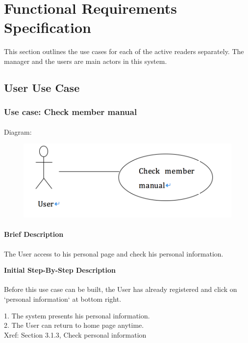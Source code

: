 \documentclass[12pt]{report}
\begin{document}
\section{Functional Requirements Specification}
\paragraph{}
This section outlines the use cases for each of the active readers separately. The manager and the users are main actors in this system.

\subsection{ User Use Case}
\subsubsection{Use case:  Check member manual}

\paragraph{}
Diagram: 
\begin{figure}[!htb]
  \includegraphics{1.PNG}
\end{figure}
\paragraph{}
\begin{flushleft}
\textbf{Brief Description }
\paragraph{}
The User access to his personal page and check his personal information. \\

\begin{flushleft}
\textbf{Initial Step-By-Step Description }
\paragraph{}
Before this use case can be built, the User has already registered and click on `personal information` at bottom right. 

\begin{flushleft}
1.	The system presents his personal information. \\
2.	The User can return to home page anytime. \\
Xref: Section 3.1.3, Check personal information
\end{flushleft}
\end{flushleft}
\end{flushleft}
\end{document}
